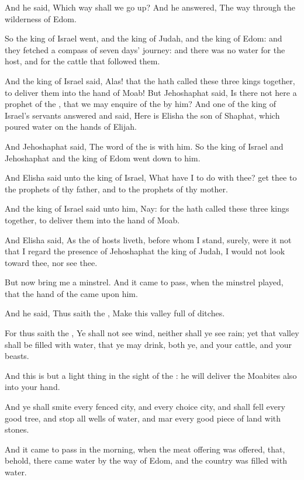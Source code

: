 \Verse And he said, Which way shall we go up? And he answered, The way through the wilderness of Edom.

\Verse So the king of Israel went, and the king of Judah, and the king of Edom: and they fetched a compass of seven days' journey: and there was no water for the host, and for the cattle that followed them.

\Verse And the king of Israel said, Alas! that the \LORD hath called these three kings together, to deliver them into the hand of Moab!  \Verse But Jehoshaphat said, Is there not here a prophet of the \LORD, that we may enquire of the \LORD by him? And one of the king of Israel's servants answered and said, Here is Elisha the son of Shaphat, which poured water on the hands of Elijah.

\Verse And Jehoshaphat said, The word of the \LORD is with him. So the king of Israel and Jehoshaphat and the king of Edom went down to him.

\Verse And Elisha said unto the king of Israel, What have I to do with thee?  get thee to the prophets of thy father, and to the prophets of thy mother.

And the king of Israel said unto him, Nay: for the \LORD hath called these three kings together, to deliver them into the hand of Moab.

\Verse And Elisha said, As the \LORD of hosts liveth, before whom I stand, surely, were it not that I regard the presence of Jehoshaphat the king of Judah, I would not look toward thee, nor see thee.

\Verse But now bring me a minstrel. And it came to pass, when the minstrel played, that the hand of the \LORD came upon him.

\Verse And he said, Thus saith the \LORD, Make this valley full of ditches.

\Verse For thus saith the \LORD, Ye shall not see wind, neither shall ye see rain; yet that valley shall be filled with water, that ye may drink, both ye, and your cattle, and your beasts.

\Verse And this is but a light thing in the sight of the \LORD: he will deliver the Moabites also into your hand.

\Verse And ye shall smite every fenced city, and every choice city, and shall fell every good tree, and stop all wells of water, and mar every good piece of land with stones.

\Verse And it came to pass in the morning, when the meat offering was offered, that, behold, there came water by the way of Edom, and the country was filled with water.

